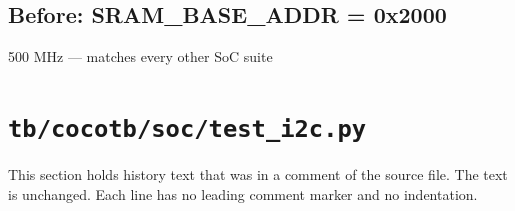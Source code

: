 \begin{record}

\subsection*{Before: SRAM\_BASE\_ADDR = 0x2000}

\begin{textblock}
500 MHz — matches every other SoC suite
\end{textblock}

\end{record}

\section{\texttt{tb/cocotb/soc/test\_i2c.py}}\label{cr:suite:soc-test-i2c}

This section holds history text that was in a comment of the source file. The text is unchanged. Each line has no leading comment marker and no indentation.

